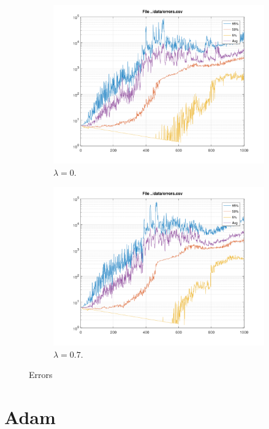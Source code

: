 \documentclass[a4paper,11pt]{article}
\begin{document}
\begin{figure}[h!]
	\centering
	\begin{subfigure}[b]{0.4\linewidth}
		\includegraphics[width=\linewidth]{errors-0.png}
		\caption{$\lambda=0$.}
	\end{subfigure}
	\begin{subfigure}[b]{0.4\linewidth}
		\includegraphics[width=\linewidth]{errors-07.png}
		\caption{$\lambda=0.7$.}
	\end{subfigure}
	\caption{Errors}
	\label{fig:errors}
\end{figure}

\section{Adam}
\end{document}

